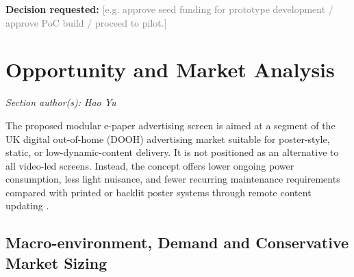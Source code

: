 \documentclass[11pt,a4paper]{article}
\newcommand{\placeholder}[1]{\textcolor{gray}{#1}}
\begin{document}
\textbf{Decision requested:} \placeholder{[e.g. approve seed funding for prototype development / approve PoC build / proceed to pilot.]}

\section{Opportunity and Market Analysis}
\textit{Section author(s): Hao Yu}

The proposed modular e-paper advertising screen is aimed at a segment of the UK digital out-of-home (DOOH) advertising market suitable for poster-style, static, or low-dynamic-content delivery. It is not positioned as an alternative to all video-led screens. Instead, the concept offers lower ongoing power consumption, less light nuisance, and fewer recurring maintenance requirements compared with printed or backlit poster systems through remote content updating \cite{ref1,ref2,ref3}.

\subsection{Macro-environment, Demand and Conservative Market Sizing}
\end{document}
